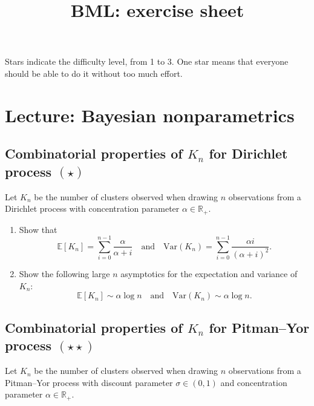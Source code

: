 \documentclass{article}
\title{BML: exercise sheet}
\date{}
\def\E{\mathbb{E}}
\def\Var{\mbox{Var}}
\begin{document}
\maketitle

Stars indicate the difficulty level, from 1 to 3. One star means that everyone should be able to do it without too much effort.

\section{Lecture: Bayesian nonparametrics}

\subsection{Combinatorial properties of $K_n$ for Dirichlet process $(\star)$}
\label{ex:K_n-DP}
Let $K_n$ be the number of clusters observed when drawing $n$ observations from a Dirichlet process with concentration parameter $\alpha\in\mathbb{R}_+$.

\begin{enumerate}
	\item Show that 
\begin{equation*}
    \E[K_{n}] = \sum_{i=0}^{n-1} \frac{\alpha}{\alpha + i} \quad \text{and} \quad \Var(K_n) = \sum_{i=0}^{n-1} \frac{\alpha i}{(\alpha + i)^2}.
\end{equation*}
	\item Show the following large $n$ asymptotics for the expectation and variance of $K_n$:
\begin{equation*}
        \E[K_n] \sim \alpha\log n  \quad \text{and} \quad \Var(K_n)\sim \alpha\log n.
\end{equation*}
\end{enumerate}

\subsection{Combinatorial properties of $K_n$ for Pitman--Yor process $(\star\star)$}
\label{ex:K_n-PY}
Let $K_n$ be the number of clusters observed when drawing $n$ observations from a Pitman--Yor process with discount parameter $\sigma\in(0,1)$ and concentration parameter $\alpha\in\mathbb{R}_+$.
\end{document}
